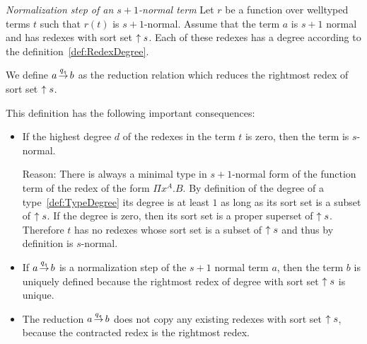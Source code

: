\begin{definition}
    \label{def:NormalizationStep}
    \emph{Normalization step of an $s+1$-normal term}
    Let $r$ be a function over welltyped terms $t$ such that $r(t)$ is
    $s+1$-normal. Assume that the term $a$ is $s+1$ normal and has redexes with
    sort set ${\uparrow s}$. Each of these redexes has a degree according to
    the definition~\ref{def:RedexDegree}.

    We define $a {\,\stackrel{q_s}{\to}\,} b$ as the reduction relation
    which reduces the rightmost redex of sort set ${\uparrow s}$.

    This definition has the following important consequences:
    \begin{itemize}
        \item
            If the highest degree $d$ of the redexes in the term $t$ is zero,
            then the term is $s$-normal.

            Reason: There is always a minimal type in $s+1$-normal form of the
            function term of the redex of the form $\Pi x^A. B$. By definition
            of the degree of a type~\ref{def:TypeDegree} its degree is at least
            $1$ as long as its sort set is a subset of ${\uparrow s}$. If the
            degree is zero, then its sort set is a proper superset of ${\uparrow s}$. Therefore $t$ has no redexes whose sort set is a subset of
            ${\uparrow s}$ and thus by definition is $s$-normal.

        \item
            If $a {\,\stackrel{q_s}{\to}\,} b$ is a normalization step of the $s+1$ normal
            term $a$, then the term $b$ is uniquely defined because the
            rightmost redex of degree with sort set ${\uparrow s}$ is unique.

        \item The reduction $a {\,\stackrel{q_s}{\to}\,} b$ does not copy any existing
            redexes with sort set ${\uparrow s}$, because the contracted redex is
            the rightmost redex.
    \end{itemize}
\end{definition}


